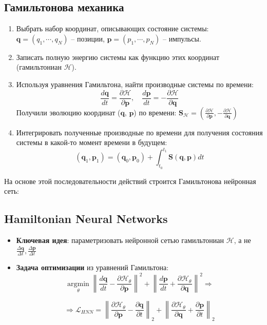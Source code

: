 \subsection{Гамильтонова механика}
\begin{enumerate}
	\item Выбрать набор координат, описывающих состояние системы: $\textbf{q}=(q_1, \cdots,q_N)$ -- позиции, $\textbf{p}=(p_1,\cdots,p_N)$ -- импульсы.
	\item Записать полную энергию системы как функцию этих координат (гамильтониан $\mathcal{H}$). 
	\item Используя уравнения Гамильтона, найти производные системы по времени:
	$$
	\frac{d \mathbf{q}}{d t}=\frac{\partial \mathcal{H}}{\partial \mathbf{p}}, \quad \frac{d \mathbf{p}}{d t}=-\frac{\partial \mathcal{H}}{\partial \mathbf{q}}
	$$
	Получили эволюцию координат ($\textbf{q, p}$) по времени: $
	\mathbf{S}_{\mathcal{H}}=\left(\frac{\partial \mathcal{H}}{\partial \mathbf{p}},-\frac{\partial \mathcal{H}}{\partial \mathbf{q}}\right)
	$
	\item Интегрировать полученные производные по времени для получения состояния системы в какой-то момент времени в будущем: $$ \left(\mathbf{q}_{1}, \mathbf{p}_{1}\right)=\left(\mathbf{q}_{0}, \mathbf{p}_{0}\right)+\int_{t_{0}}^{t_{1}} \mathbf{S}(\mathbf{q}, \mathbf{p}) d t$$
	
\end{enumerate}

На основе этой последовательности действий строится Гамильтонова нейронная сеть:


\subsection{Hamiltonian Neural Networks}

\begin{itemize}
	\item \textbf{Ключевая идея}: параметризовать нейронной сетью гамильтониан $\mathcal{H}$, а не  $\frac{\Delta \mathbf{q}}{\Delta t},  \frac{\Delta \mathbf{p}}{\Delta t}$
	\item \textbf{Задача оптимизации} из уравнений Гамильтона: 
	$$
	\underset{\theta}{\operatorname{argmin}}\left\|\frac{d \mathbf{q}}{d t}-\frac{\partial \mathcal{H}_{\theta}}{\partial \mathbf{p}}\right\|^{2}+\left\|\frac{d \mathbf{p}}{d t}+\frac{\partial \mathcal{H}_{\theta}}{\partial \mathbf{q}}\right\|^{2}
	\Rightarrow $$
	
	$$\Rightarrow \mathcal{L}_{H N N}=\left\|\frac{\partial \mathcal{H}_{\theta}}{\partial \mathbf{p}}-\frac{\partial \mathbf{q}}{\partial t}\right\|_{2}+\left\|\frac{\partial \mathcal{H}_{\theta}}{\partial \mathbf{q}}+\frac{\partial \mathbf{p}}{\partial t}\right\|_{2}
	$$
\end{itemize}


